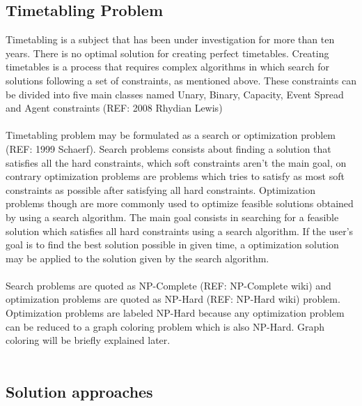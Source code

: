 \subsection{Timetabling Problem}
Timetabling is a subject that has been under investigation for more than ten years. There is no optimal solution for creating perfect timetables. Creating timetables is a process that requires complex algorithms in which search for solutions following a set of constraints, as mentioned above. These constraints can be divided into five main classes named Unary, Binary, Capacity, Event Spread and Agent constraints (REF: 2008 Rhydian Lewis)\\
\\
Timetabling problem may be formulated as a search or optimization problem (REF: 1999 Schaerf). Search problems consists about finding a solution that satisfies all the hard constraints, which soft constraints aren't the main goal, on contrary optimization problems are problems which tries to satisfy as most soft constraints as possible after satisfying all hard constraints. Optimization problems though are more commonly used to optimize feasible solutions obtained by using a search algorithm. The main goal consists in searching for a feasible solution which satisfies all hard constraints using a search algorithm. If the user's goal is to find the best solution possible in given time, a optimization solution may be applied to the solution given by the search algorithm.\\
\\
Search problems are quoted as NP-Complete (REF: NP-Complete wiki) and optimization problems are quoted as NP-Hard (REF: NP-Hard wiki) problem. Optimization problems are labeled NP-Hard because any optimization problem can be reduced to a graph coloring problem which is also NP-Hard. Graph coloring will be briefly explained later.\\
\\

\subsection{Solution approaches}
\label{subsection:SolutionsAppr}

